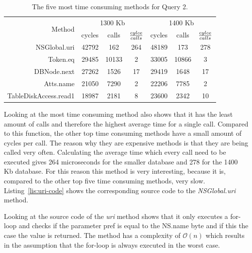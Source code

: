 \begin {table}[htpb] 
  \begin{center}
\begin {tabular} {|r|r|c|c|r|c|c|}
  	\hline
	\multirow{2}{*}{Method}&\multicolumn{3}{c}{1300 Kb}&\multicolumn{3}{|c|}{1400 Kb}\\
	\cline{2-7}
	&cycles&calls&${cylce \over calls}$&cycles&calls&${cylce \over calls}$\\
	\hline
	\hline
	NSGlobal.uri&42792&162&264&48189&173&278\\
	\hline
	Token.eq&29485&10133&2&33005&10866&3\\
	\hline
	DBNode.next&27262&1526&17&29419&1648&17\\
	\hline
	Atts.name&21050&7290&2&22206&7785&2\\
	\hline
	TableDiskAccess.read1&18987&2181&8&23600&2342&10\\
	\hline
\end {tabular}
\caption {The five most time consuming methods for Query 2.}
\label {tab:traceview-q2-methods}
\end{center}
\end {table}
Looking at the most time consuming method also shows that it has the least amount of calls and therefore the highest average time for a single call.
Compared to this function, the other top time consuming methods have a small amount of cycles per call.
The reason why they are expensive methods is that they are being called very often.
Calculating the average time which every call need to be executed gives 264 microseconds for the smaller database and 278 for the 1400 Kb database.
For this reason this method is very interesting, because it is, compared to the other top five time consuming methods, very slow.
Listing~\ref{lis:uri-code} shows the corresponding source code to the \textit{NSGlobal.uri} method.
		
Looking at the source code of the \textit{uri} method shows that it only executes a for-loop and checks if the parameter \textsf{pref} is equal to the \textsf{NS.name} byte and if this the case the value is returned.
The method has a complexity of $\mathcal O(n)$ which results in the assumption that the for-loop is always executed in the worst case.
